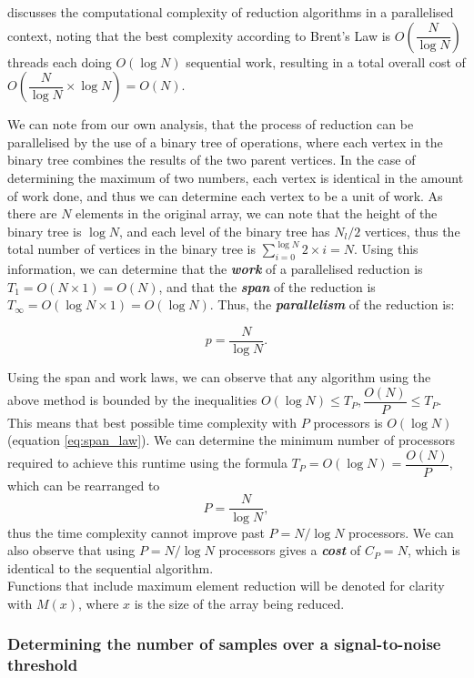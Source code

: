 \documentclass{article}
\begin{document}
\cite{reduction} discusses the computational complexity of reduction algorithms in a parallelised context, noting that the best complexity according to Brent's Law is \(O(\dfrac{N}{\log N})\) threads each doing \(O(\log N)\) sequential work, resulting in a total overall cost of \(O(\dfrac{N}{\log N}\times{\log N}) = O(N)\).

We can note from our own analysis, that the process of reduction can be parallelised by the use of a binary tree of operations, where each vertex in the binary tree combines the results of the two parent vertices.
In the case of determining the maximum of two numbers, each vertex is identical in the amount of work done, and thus we can determine each vertex to be a unit of work.
As there are \(N\) elements in the original array, we can note that the height of the binary tree is \(\log N\), and each level of the binary tree has \(N_l/2\) vertices, thus the total number of vertices in the binary tree is \(\sum_{i=0}^{\log N}{2\times{i}} = N\).
Using this information, we can determine that the \textit{\textbf{work}} of a parallelised reduction is \(T_1 = O(N\times1) = O(N)\), and that the \textit{\textbf{span}} of the reduction is \(T_\infty = O(\log N \times {1}) = O(\log N)\).
Thus, the \textit{\textbf{parallelism}} of the reduction is:

\[
    p = \dfrac{N}{\log N}.
\]

Using the span and work laws, we can observe that any algorithm using the above method is bounded by the inequalities \(O(\log N) \leq T_P, \dfrac{O(N)}{P} \leq T_P\).
This means that best possible time complexity with \(P\) processors is \(O(\log N)\) (equation \ref{eq:span_law}).
We can determine the minimum number of processors required to achieve this runtime using the formula \(T_P = O(\log N) = \dfrac{O(N)}{P}\), which can be rearranged to
\[
    P = \dfrac{N}{\log N},
\]
thus the time complexity cannot improve past \(P = N/\log N\) processors.
We can also observe that using \(P = N/\log N\) processors gives a \textit{\textbf{cost}} of \(C_P = N\), which is identical to the sequential algorithm.
\\

Functions that include maximum element reduction will be denoted for clarity with \(M(x)\), where \(x\) is the size of the array being reduced.

\subsubsection{Determining the number of samples over a signal-to-noise threshold} \label{sec:discuss:analysis:peaks}
\end{document}
